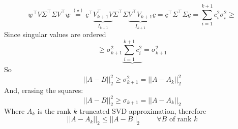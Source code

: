 \[
     \underline{w}^\intercal V\Sigma^\intercal \Sigma V^\intercal \underline{w} \overset{(\star)}{=} \underline{c}^\intercal \underbrace{V_{k+1}^\intercal V}_{I_{k+1}} \Sigma^\intercal \Sigma  \underbrace{V^\intercal V_{k+1}}_{I_{k+1}} \underline{c} = \underline{c}^\intercal \Sigma^\intercal \Sigma \underline{c} = \sum_{i=1}^{k+1} c_i^2 \sigma_i^2 \geq    
\] 
Since singular values are ordered
\[
    \geq \sigma_{k+1}^2 \underbrace{\sum_{i=1}^{k+1} c_i^2} = \sigma_{k+1}^2    
\]
So
\[
    ||A-B||_2^2 \geq \sigma_{k+1}^2 = ||A - A_k||_2^2    
\]
And, erasing the squares:
\[
    ||A - B||_2^2 \geq \sigma_{k+1} = ||A - A_k||_2        
\]
Where $A_k$ is the rank $k$ truncated SVD approximation, therefore
\[
    ||A - A_k||_2 \leq ||A - B||_2 \hspace{1cm} \forall B \text{ of rank } k
\]




